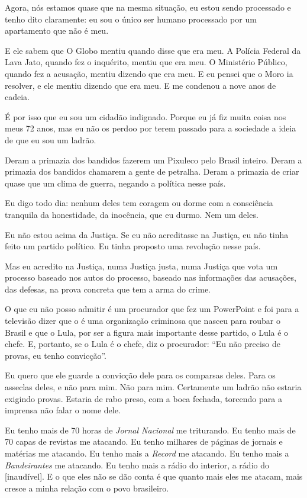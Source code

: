 Agora, nós estamos quase que na mesma situação, eu estou sendo
processado e tenho dito claramente: eu
sou o único ser humano processado por um apartamento que não é
meu.

E ele sabem que O Globo mentiu quando disse que era meu. A Polícia
Federal da Lava Jato, quando fez o inquérito, mentiu que era meu. O
Ministério Público, quando fez a acusação, mentiu dizendo que era meu. E
eu pensei que o Moro ia resolver, e ele mentiu dizendo que era meu. E me
condenou a nove anos de cadeia.

É por isso que eu sou um cidadão indignado. Porque eu já fiz muita
coisa nos meus 72 anos, mas eu não os perdoo por terem passado para a
sociedade a ideia de que eu sou um ladrão.

Deram a primazia dos bandidos fazerem um Pixuleco pelo Brasil
inteiro. Deram a primazia dos bandidos chamarem a gente de petralha.
Deram a primazia de criar quase que um clima de guerra, negando a
política nesse país.

Eu digo todo dia: nenhum deles tem coragem ou dorme com a
consciência tranquila da honestidade, da inocência, que eu durmo. Nem um
deles.

Eu não estou acima da Justiça. Se eu não acreditasse na Justiça,
eu não tinha feito um partido político. Eu tinha proposto uma revolução
nesse país.

Mas eu acredito na Justiça, numa Justiça justa, numa Justiça que
vota um processo baseado nos autos do processo, baseado nas informações
das acusações, das defesas, na prova concreta que tem a arma do crime.

O que eu não posso admitir é um procurador que fez um PowerPoint e
foi para a televisão dizer que o  é uma organização criminosa que
nasceu para roubar o Brasil e que o Lula, por ser a figura mais
importante desse partido, o Lula é o chefe. E, portanto, se o Lula é o
chefe, diz o procurador: ``Eu não preciso de provas, eu tenho
convicção''.

Eu quero que ele guarde a convicção dele para os comparsas deles.
Para os asseclas deles, e não para mim. Não para mim. Certamente um
ladrão não estaria exigindo provas. Estaria de rabo preso, com a boca
fechada, torcendo para a imprensa não falar o nome dele.

Eu tenho mais de 70 horas de \emph{Jornal Nacional} me triturando. Eu
tenho mais de 70 capas de revistas me atacando. Eu tenho
milhares de páginas de jornais e matérias me atacando. Eu tenho mais a
\emph{Record} me atacando. Eu tenho mais a \emph{Bandeirantes} me atacando. Eu tenho
mais a rádio do interior, a rádio do [inaudível]. E o que eles não
se dão conta é que quanto mais eles me atacam, mais cresce a minha
relação com o povo brasileiro.

